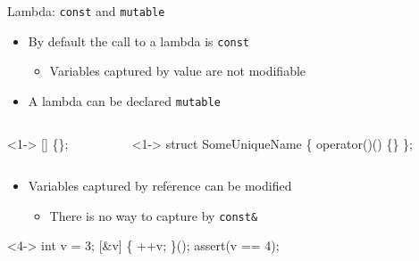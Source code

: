 \begin{frame}[fragile]{Lambda: \texttt{const} and \texttt{mutable}}
  \begin{itemize}
  \item By default the call to a lambda is \texttt{const}
    \begin{itemize}
    \item Variables captured by value are not modifiable
    \end{itemize}
  \item<2-> A lambda can be declared \texttt{mutable}
  \end{itemize}

  \begin{columns}
    \begin{column}{.5\textwidth}
      \begin{codeblock}<1->{
[] \{\};}\end{codeblock}
    \end{column}

    \begin{column}{.5\textwidth}
      \begin{codeblock}<1->{
struct SomeUniqueName \{
   operator()() \{\}
\};}\end{codeblock}
    \end{column}
  \end{columns}

  \begin{itemize}
  \item<4-> Variables captured by reference can be modified
    \begin{itemize}
    \item There is no way to capture by \texttt{const\&}
    \end{itemize}
  \end{itemize}

  \begin{codeblock}<4->
int v = 3;
[\&v] \{ ++v; \}();
assert(v == 4);\end{codeblock}

\end{frame}

